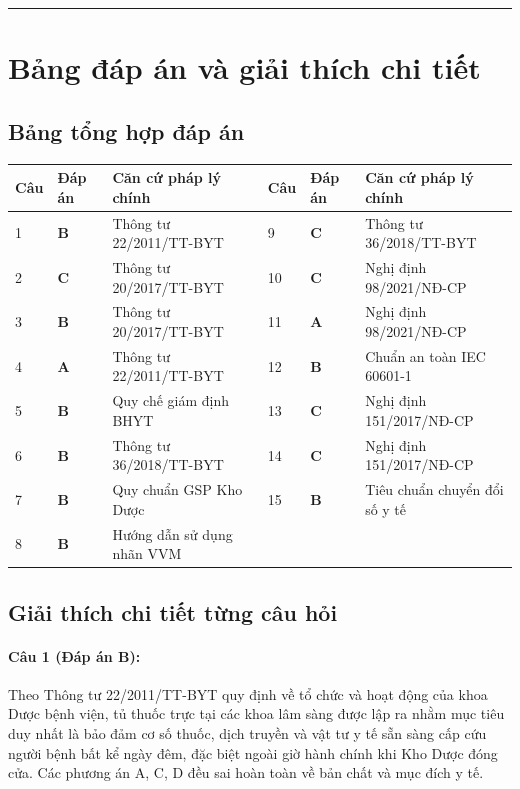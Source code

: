 \documentclass[12pt,a4paper]{article}
\begin{document}
\vspace{1.5em}
\hrule
\vspace{1.5em}

\section{Bảng đáp án và giải thích chi tiết}

\subsection{Bảng tổng hợp đáp án}

\begin{table}[htbp]
\centering
\small
\begin{tabularx}{\textwidth}{C{1.1cm} C{1.2cm} Y C{1.1cm} C{1.2cm} Y}
\toprule
\textbf{Câu} & \textbf{Đáp án} & \textbf{Căn cứ pháp lý chính} & \textbf{Câu} & \textbf{Đáp án} & \textbf{Căn cứ pháp lý chính} \\
 & \textbf{B} & Thông tư 22/2011/TT-BYT & 9 & \textbf{C} & Thông tư 36/2018/TT-BYT \\
2 & \textbf{C} & Thông tư 20/2017/TT-BYT & 10 & \textbf{C} & Nghị định 98/2021/NĐ-CP \\
3 & \textbf{B} & Thông tư 20/2017/TT-BYT & 11 & \textbf{A} & Nghị định 98/2021/NĐ-CP \\
4 & \textbf{A} & Thông tư 22/2011/TT-BYT & 12 & \textbf{B} & Chuẩn an toàn IEC 60601-1 \\
5 & \textbf{B} & Quy chế giám định BHYT & 13 & \textbf{C} & Nghị định 151/2017/NĐ-CP \\
6 & \textbf{B} & Thông tư 36/2018/TT-BYT & 14 & \textbf{C} & Nghị định 151/2017/NĐ-CP \\
7 & \textbf{B} & Quy chuẩn GSP Kho Dược & 15 & \textbf{B} & Tiêu chuẩn chuyển đổi số y tế \\
8 & \textbf{B} & Hướng dẫn sử dụng nhãn VVM & & & \\
\bottomrule
\end{tabularx}
\end{table}

\subsection{Giải thích chi tiết từng câu hỏi}

\paragraph{\textbf{Câu 1 (Đáp án B):}} Theo Thông tư 22/2011/TT-BYT quy định về tổ chức và hoạt động của khoa Dược bệnh viện, tủ thuốc trực tại các khoa lâm sàng được lập ra nhằm mục tiêu duy nhất là bảo đảm cơ số thuốc, dịch truyền và vật tư y tế sẵn sàng cấp cứu người bệnh bất kể ngày đêm, đặc biệt ngoài giờ hành chính khi Kho Dược đóng cửa. Các phương án A, C, D đều sai hoàn toàn về bản chất và mục đích y tế.
\end{document}
